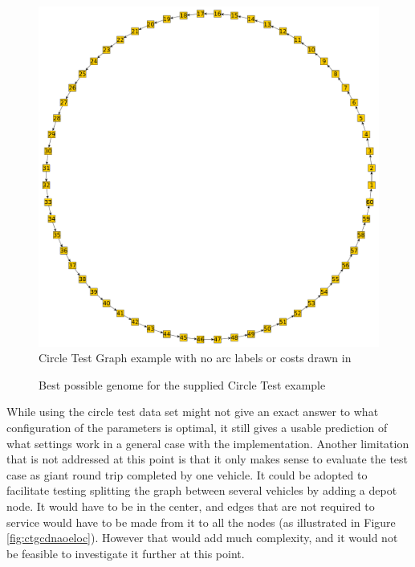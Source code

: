 \begin{figure}[H]
    \centerline{\includegraphics[width=\textwidth]{figures/CircleTests/CircleTestIllustrations/Circle_Test_Graph-No_arc_labels_or_costs.pdf}}
    \caption{Circle Test Graph example with no arc labels or costs drawn in}
    \label{fig:ctgnaloc}
\end{figure}

\begin{figure}[H]
    \noindent
    \caption{Best possible genome for the supplied Circle Test example}
    \label{fig:bpgftscte}
\end{figure}

While using the circle test data set might not give an exact answer to what configuration of the parameters is optimal, it still gives a usable prediction of what settings work in a general case with the implementation. Another limitation that is not addressed at this point is that it only makes sense to evaluate the test case as giant round trip completed by one vehicle. It could be adopted to facilitate testing splitting the graph between several vehicles by adding a depot node. It would have to be in the center, and edges that are not required to service would have to be made from it to all the nodes (as illustrated in Figure \ref{fig:ctgcdnaoeloc}). However that would add much complexity, and it would not be feasible to investigate it further at this point.

